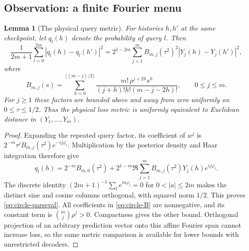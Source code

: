 \documentclass[11pt]{amsart}
\newtheorem{lemma}[theorem]{Lemma}
\theoremstyle{definition}\newtheorem{definition}[theorem]{Definition}
\theoremstyle{remark}\newtheorem{remark}[theorem]{Remark}
\begin{document}
\subsection{Observation: a finite Fourier menu}
\begin{lemma}[The physical query metric]\label{lem:circle-query-metric}
For histories $h,h'$ at the same checkpoint, let $q_l(h)$ denote the
probability of query $l$. Then
\begin{equation}\label{eq:circle-parseval}
 \frac1{2m+1}\sum_{l=0}^{2m}|q_l(h)-q_l(h')|^2
 =2^{1-2m}\sum_{j=1}^{m} B_{m,j}(\tau^2)^2
                       |Y_j(h)-Y_j(h')|^2,
\end{equation}
where
\begin{equation}\label{eq:circle-B}
 B_{m,j}(s)=\sum_{h=0}^{\lfloor(m-j)/2\rfloor}
 \frac{m!\,\rho^{j+2h}s^h}{(j+h)!h!(m-j-2h)!},\qquad 0\le j\le m.
\end{equation}
For $j\ge1$ these factors are bounded above and away from zero uniformly
on $0\le\tau\le1/2$. Thus the physical loss metric is uniformly
equivalent to Euclidean distance in $(Y_1,\ldots,Y_m)$.
\end{lemma}
\begin{proof}
Expanding the repeated query factor, its coefficient of $w^j$ is
$2^{-m}\tau^jB_{m,j}(\tau^2)e^{-ij\varphi_l}$. Multiplication by
the posterior density and Haar integration therefore give
\[
 q_l(h)=2^{-m}B_{m,0}(\tau^2)+
       2^{1-m}\Re\sum_{j=1}^{m}B_{m,j}(\tau^2)Y_j(h)e^{ij\varphi_l}.
\]
The discrete identity
$(2m+1)^{-1}\sum_l e^{ia\varphi_l}=0$ for
$0<|a|\le2m$ makes the distinct sine and cosine columns orthogonal,
with squared norm $1/2$. This proves \eqref{eq:circle-parseval}.
All coefficients in \eqref{eq:circle-B} are nonnegative, and its
constant term is $\binom mj\rho^j>0$. Compactness gives the other
bound. Orthogonal projection of an arbitrary prediction vector onto
this affine Fourier span cannot increase loss, so the same metric
comparison is available for lower bounds with unrestricted decoders.
\end{proof}
\end{document}
